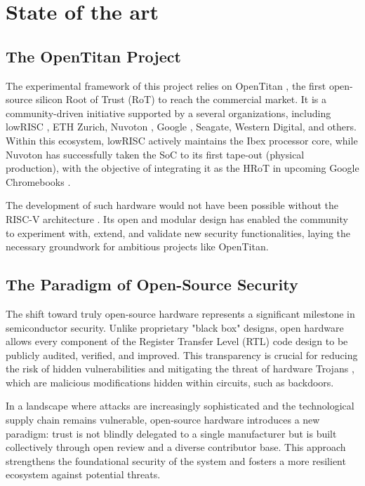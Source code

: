 \documentclass[10pt,a4paper,twocolumn,twoside]{article}
\begin{document}
\section{State of the art}

\subsection{The OpenTitan Project}
The experimental framework of this project relies on OpenTitan \cite{opentitan}, the first open-source silicon Root of Trust (RoT) to reach the commercial market. It is a community-driven initiative supported by a several organizations, including lowRISC \cite{lowrisc}, ETH Zurich, Nuvoton \cite{nuovoton}, Google \cite{google}, Seagate, Western Digital, and others. Within this ecosystem, lowRISC actively maintains the Ibex processor core, while Nuvoton has successfully taken the SoC to its first tape-out (physical production), with the objective of integrating it as the HRoT in upcoming Google Chromebooks \cite{chromebook}.

The development of such hardware would not have been possible without the  RISC-V architecture \cite{isa}. Its open and modular design has enabled the community to experiment with, extend, and validate new security functionalities, laying the necessary groundwork for ambitious projects like OpenTitan.

\subsection{The Paradigm of Open-Source Security}
The shift toward truly open-source hardware represents a significant milestone in semiconductor security. Unlike proprietary "black box" designs, open hardware allows every component of the Register Transfer Level (RTL) code design to be publicly audited, verified, and improved. This transparency is crucial for reducing the risk of hidden vulnerabilities and mitigating the threat of hardware Trojans \cite{trojan}, which are malicious modifications hidden within circuits, such as backdoors.

In a landscape where attacks are increasingly sophisticated and the technological supply chain remains vulnerable, open-source hardware introduces a new paradigm: trust is not blindly delegated to a single manufacturer but is built collectively through open review and a diverse contributor base. This approach strengthens the foundational security of the system and fosters a more resilient ecosystem against potential threats.
\end{document}
